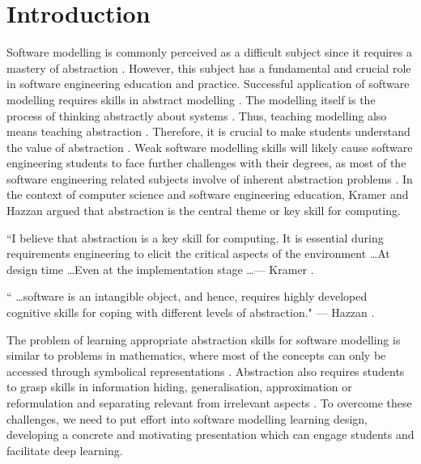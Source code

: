 \documentclass[12pt, a4paper]{report}
\begin{document}
\tableofcontents
{}

\chapter{Introduction}

Software modelling is commonly perceived as a difficult subject since it requires a mastery of abstraction \cite{Borstler2012}. However, this subject has a fundamental and crucial role in software engineering education and practice. Successful application of software modelling requires skills in abstract modelling \cite{whittle2013industrial}. The modelling itself is the process of thinking abstractly about systems \cite{bezivin2009teaching}. Thus, teaching modelling also means teaching abstraction \cite{engels2005teaching}. Therefore, it is crucial to make students understand the value of abstraction \cite{bezivin2009teaching}. Weak software modelling skills will likely cause software engineering students to face further challenges with their degrees, as most of the software engineering related subjects involve of inherent abstraction problems \cite{Kramer2007}. In the context of computer science and software engineering education, Kramer \cite{Kramer2007} and Hazzan \cite{hazzan2008reflections} argued that abstraction is the central theme or key skill for computing.

\begin{displayquote}
``I believe that abstraction is a key skill for computing. It is essential during requirements engineering to elicit the critical aspects of the environment \dots At design time \dots Even at the implementation stage \dots --- Kramer \cite{Kramer2007}.
\end{displayquote}

\begin{displayquote}
`` \dots software is an intangible object, and hence, requires highly developed cognitive skills for coping with different levels of abstraction." --- Hazzan \cite{hazzan2008reflections}.
\end{displayquote}

The problem of learning appropriate abstraction skills for software modelling is similar to problems in mathematics, where most of the concepts can only be accessed through symbolical representations \cite{Duval2006}. Abstraction also requires students to grasp skills in information hiding, generalisation, approximation or reformulation and separating relevant from irrelevant aspects \cite{Saitta2013}. To overcome these challenges, we need to put effort into software modelling learning design, developing a concrete and motivating presentation which can engage students and facilitate deep learning.
\end{document}
